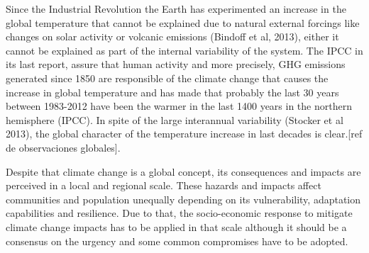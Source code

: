 Since the Industrial Revolution the Earth has experimented an increase in the global temperature that cannot be explained due to natural external forcings like changes on solar activity or volcanic emissions (Bindoff et al, 2013), either it cannot be explained as part of the internal variability of the system. The IPCC in its last report, assure that human activity and more precisely, GHG emissions generated since 1850 are responsible of the climate change that causes the increase in global temperature and has made that probably the last 30 years between 1983-2012 have been the warmer in the last 1400 years in the northern hemisphere (IPCC). In spite of the large interannual variability (Stocker et al 2013), the global character of the temperature increase in last decades is clear.[ref de observaciones globales].



Despite that climate change is a global concept, its consequences and impacts are perceived in a local and regional scale. These hazards and impacts affect communities and population unequally depending on its vulnerability, adaptation capabilities and resilience. Due to that, the socio-economic response to mitigate climate change impacts has to be applied in that scale although it should be a consensus on the urgency and some common compromises have to be adopted.


